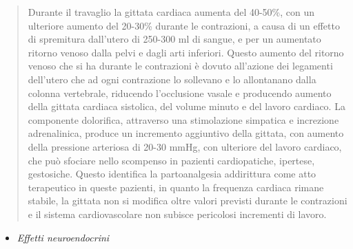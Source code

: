 \documentclass[]{article}
\begin{document}
\begin{quote}
Durante il travaglio la gittata cardiaca aumenta del 40-50\%, con un
ulteriore aumento del 20-30\% durante le contrazioni, a causa di un
effetto di spremitura dall'utero di 250-300 ml di sangue, e per un
aumentato ritorno venoso dalla pelvi e dagli arti inferiori. Questo
aumento del ritorno venoso che si ha durante le contrazioni è dovuto
all'azione dei legamenti dell'utero che ad ogni contrazione lo sollevano
e lo allontanano dalla colonna vertebrale, riducendo l'occlusione vasale
e producendo aumento della gittata cardiaca sistolica, del volume minuto
e del lavoro cardiaco. La componente dolorifica, attraverso una
stimolazione simpatica e increzione adrenalinica, produce un incremento
aggiuntivo della gittata, con aumento della pressione arteriosa di 20-30
mmHg, con ulteriore del lavoro cardiaco, che può sfociare nello
scompenso in pazienti cardiopatiche, ipertese, gestosiche. Questo
identifica la partoanalgesia addirittura come atto terapeutico in queste
pazienti, in quanto la frequenza cardiaca rimane stabile, la gittata non
si modifica oltre valori previsti durante le contrazioni e il sistema
cardiovascolare non subisce pericolosi incrementi di lavoro.
\end{quote}

\begin{itemize}
\item
  \emph{Effetti neuroendocrini}
\end{itemize}
\end{document}
